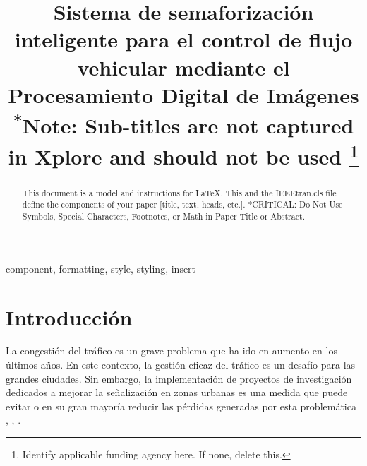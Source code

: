 \documentclass[conference]{IEEEtran}
\begin{document}
\title{Sistema de semaforización inteligente para el control de flujo vehicular mediante el Procesamiento Digital de Imágenes\\
{\footnotesize \textsuperscript{*}Note: Sub-titles are not captured in Xplore and
should not be used}
\thanks{Identify applicable funding agency here. If none, delete this.}
}
\author{
	\and
{}
\and
{}
}

\maketitle

\begin{abstract}
This document is a model and instructions for \LaTeX.
This and the IEEEtran.cls file define the components of your paper [title, text, heads, etc.]. *CRITICAL: Do Not Use Symbols, Special Characters, Footnotes, 
or Math in Paper Title or Abstract.
\end{abstract}

\begin{IEEEkeywords}
component, formatting, style, styling, insert
\end{IEEEkeywords}

\section{Introducción}
La congestión del tráfico es un grave problema que ha ido en aumento en los últimos años. En este contexto, la gestión eficaz del tráfico es un desafío para las grandes ciudades. Sin embargo, la implementación de proyectos de investigación dedicados a mejorar la señalización en zonas urbanas es una medida que puede evitar o en su gran mayoría reducir las pérdidas generadas por esta problemática \cite{Hoang2024}, \cite{Esra2024}, \cite{Victor2019}.
\end{document}
